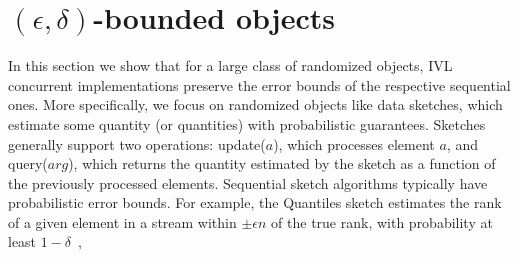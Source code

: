 \section{\texorpdfstring{$(\epsilon,\delta)$}{(epsilon,delta)}-bounded objects}
\label{ivl-sec:bounded-objects}

In this section we show that for a large class of randomized objects,
IVL concurrent implementations preserve the error bounds of the respective
sequential ones. More specifically, we focus on randomized
objects like data sketches, which estimate some quantity (or quantities)
with probabilistic guarantees.
Sketches generally support two operations:
{\sc update}($a$), which processes element $a$, and {\sc query}($arg$),
which returns the quantity estimated by the sketch as a function of the previously
processed elements. Sequential sketch algorithms typically have probabilistic error bounds. For example,
the Quantiles sketch estimates the rank of a given element in
a stream within $\pm \epsilon n$ of the true rank, with probability
at least $1-\delta$~\cite{agarwal2013mergeable}, 

